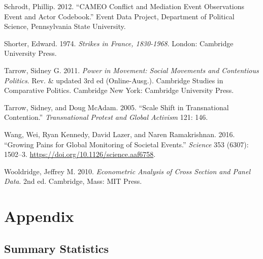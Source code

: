 \documentclass[
  11pt,
]{article}
\newlength{\cslhangindent}
\newenvironment{CSLReferences}[2] %
 {\begin{list}{}{%
  \setlength{\itemindent}{0pt}
  \setlength{\leftmargin}{0pt}
  \setlength{\parsep}{0pt}
  \ifodd #1
   \setlength{\leftmargin}{\cslhangindent}
   \setlength{\itemindent}{-1\cslhangindent}
  \fi
  \setlength{\itemsep}{#2\baselineskip}}}
 {\end{list}}
\begin{document}
\begin{CSLReferences}{1}{0}
Schrodt, Phillip. 2012. {``{CAMEO Conflict} and {Mediation Event
Observations Event} and {Actor Codebook}.''} Event Data Project,
Department of Political Science, Pennsylvania State University.

Shorter, Edward. 1974. \emph{Strikes in {France}, 1830-1968}. London:
Cambridge University Press.

Tarrow, Sidney G. 2011. \emph{Power in Movement: Social Movements and
Contentious Politics}. Rev. \& updated 3rd ed (Online-Ausg.). Cambridge
{Studies} in {Comparative Politics}. Cambridge New York: Cambridge
University Press.

Tarrow, Sidney, and Doug McAdam. 2005. {``Scale Shift in Transnational
Contention.''} \emph{Transnational Protest and Global Activism} 121:
146.

Wang, Wei, Ryan Kennedy, David Lazer, and Naren Ramakrishnan. 2016.
{``Growing Pains for Global Monitoring of Societal Events.''}
\emph{Science} 353 (6307): 1502--3.
\url{https://doi.org/10.1126/science.aaf6758}.

Wooldridge, Jeffrey M. 2010. \emph{Econometric Analysis of Cross Section
and Panel Data}. 2nd ed. Cambridge, Mass: MIT Press.

\end{CSLReferences}

\clearpage
\FloatBarrier
\appendix
\renewcommand{\thetable}{A\arabic{table}}
\renewcommand{\thefigure}{A\arabic{figure}}
\setcounter{table}{0}
\setcounter{figure}{0}
\setlength{\parindent}{0.5in}
\setlength{\leftskip}{0in}
\setlength{\parskip}{0em}

\section{Appendix}\label{appendix}

\subsection{Summary Statistics}\label{summary-statistics}
\end{document}
